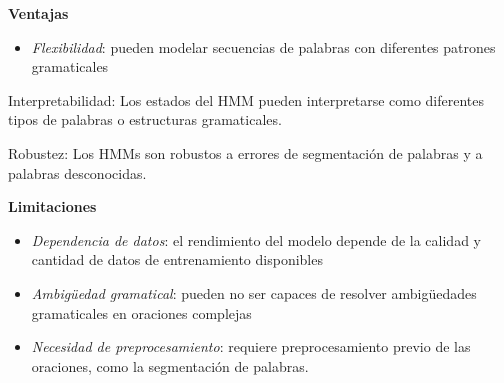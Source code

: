 \documentclass[
  a4paper,
  DIV=11,
  numbers=noendperiod]{scrreprt}
\providecommand{\tightlist}{%
  \setlength{\itemsep}{0pt}\setlength{\parskip}{0pt}}\usepackage{longtable,booktabs,array}
\begin{document}
\textbf{Ventajas}

\begin{itemize}
\tightlist
\item
  \emph{Flexibilidad}: pueden modelar secuencias de palabras con
  diferentes patrones gramaticales
\end{itemize}

Interpretabilidad: Los estados del HMM pueden interpretarse como
diferentes tipos de palabras o estructuras gramaticales.

Robustez: Los HMMs son robustos a errores de segmentación de palabras y
a palabras desconocidas.

\textbf{Limitaciones}

\begin{itemize}
\item
  \emph{Dependencia de datos}: el rendimiento del modelo depende de la
  calidad y cantidad de datos de entrenamiento disponibles
\item
  \emph{Ambigüedad gramatical}: pueden no ser capaces de resolver
  ambigüedades gramaticales en oraciones complejas
\item
  \emph{Necesidad de preprocesamiento}: requiere preprocesamiento previo
  de las oraciones, como la segmentación de palabras.
\end{itemize}
\end{document}
